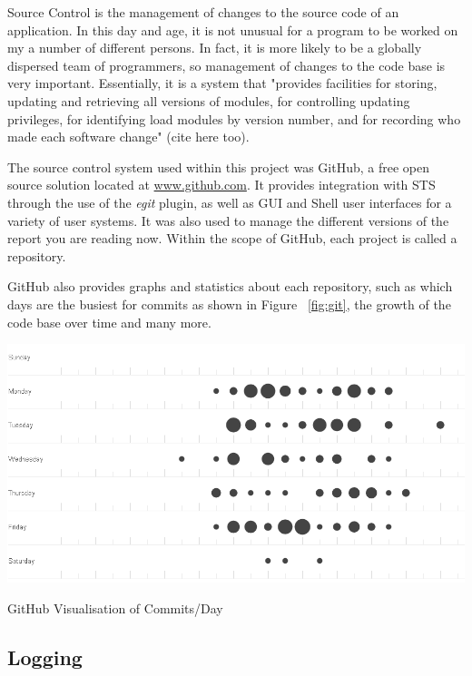 Source Control is the management of changes to the source code of an application. In this day and age, it is not unusual for a program to be worked on my a number of different persons. In fact, it is more likely to be a globally dispersed team of programmers, so management of changes to the code base is very important. Essentially, it is a system that "provides facilities for storing, updating and retrieving all versions of modules, for controlling updating privileges, for identifying load modules by version number, and for recording who made each software change" (cite here too).

The source control system used within this project was GitHub, a free open source solution located at \href{http://www.github.com}{www.github.com}. It provides integration with STS through the use of the \textit{egit} plugin, as well as GUI and Shell user interfaces for a variety of user systems. It was also used to manage the different versions of the report you are reading now. Within the scope of GitHub, each project is called a repository.

GitHub also provides graphs and statistics about each repository, such as which days are the busiest for commits as shown in Figure ~\ref{fig:git}, the growth of the code base over time and many more.

\begin{table}[H]
\begin{center}
\includegraphics[width=15cm]{git.png}
\end{center}
\caption{GitHub Visualisation of Commits/Day}
\label{fig:dispatcherflow}
\end{table}

\subsection{Logging}

